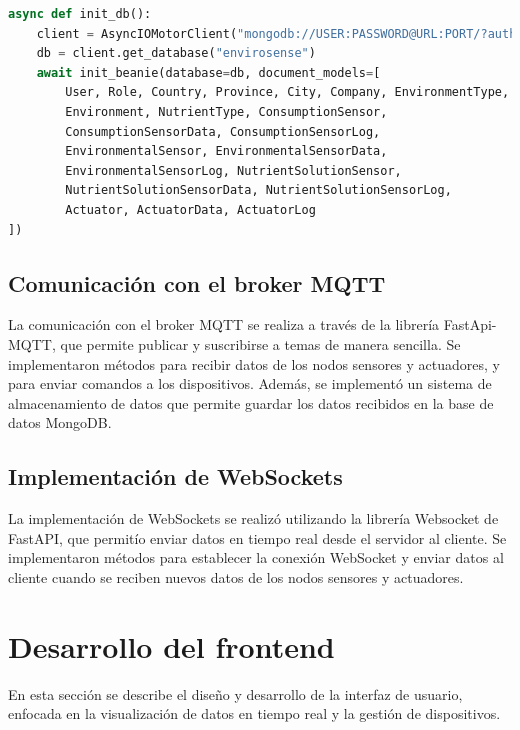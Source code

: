 \begin{lstlisting}[label=cod:mongo_connection,caption=Ejemplo de conexión a MongoDB, language=Python]
async def init_db():
    client = AsyncIOMotorClient("mongodb://USER:PASSWORD@URL:PORT/?authSource=admin")
    db = client.get_database("envirosense")
    await init_beanie(database=db, document_models=[
        User, Role, Country, Province, City, Company, EnvironmentType, 
        Environment, NutrientType, ConsumptionSensor, 
        ConsumptionSensorData, ConsumptionSensorLog, 
        EnvironmentalSensor, EnvironmentalSensorData, 
        EnvironmentalSensorLog, NutrientSolutionSensor, 
        NutrientSolutionSensorData, NutrientSolutionSensorLog, 
        Actuator, ActuatorData, ActuatorLog
])
\end{lstlisting}

\subsection{Comunicación con el broker MQTT}
La comunicación con el broker MQTT se realiza a través de la librería
FastApi-MQTT, que permite publicar y suscribirse a temas de manera sencilla. Se
implementaron métodos para recibir datos de los nodos sensores y actuadores, y
para enviar comandos a los dispositivos. Además, se implementó un sistema de
almacenamiento de datos que permite guardar los datos recibidos en la base de
datos MongoDB.

\subsection{Implementación de WebSockets}
La implementación de WebSockets se realizó utilizando la librería Websocket de
FastAPI, que permitío enviar datos en tiempo real desde el servidor al cliente.
Se implementaron métodos para establecer la conexión WebSocket y enviar datos
al cliente cuando se reciben nuevos datos de los nodos sensores y actuadores.

\section{Desarrollo del frontend}

En esta sección se describe el diseño y desarrollo de la interfaz de usuario,
enfocada en la visualización de datos en tiempo real y la gestión de
dispositivos.

